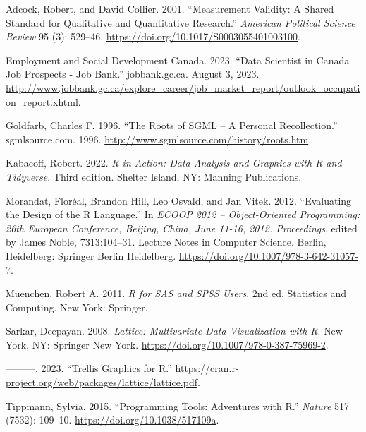 \documentclass[
  letterpaper,
  DIV=11,
  numbers=noendperiod]{scrreprt}
\newlength{\cslhangindent}
\newlength{\cslentryspacingunit} %
\newenvironment{CSLReferences}[2] %
 {%
  \setlength{\parindent}{0pt}
  \ifodd #1
  \let\oldpar\par
  \def\par{\hangindent=\cslhangindent\oldpar}
  \fi
  \setlength{\parskip}{#2\cslentryspacingunit}
 }%
 {}
\begin{document}
\hypertarget{refs}{}
\begin{CSLReferences}{1}{0}
\leavevmode{}%
Adcock, Robert, and David Collier. 2001. {``Measurement {Validity}: {A
Shared Standard} for {Qualitative} and {Quantitative Research}.''}
\emph{American Political Science Review} 95 (3): 529--46.
\url{https://doi.org/10.1017/S0003055401003100}.

\leavevmode{}%
Employment and Social Development Canada. 2023. {``Data {Scientist} in
{Canada} \textbar{} {Job} Prospects - {Job Bank}.''} {jobbank.gc.ca}.
August 3, 2023.
\url{http://www.jobbank.gc.ca/explore_career/job_market_report/outlook_occupation_report.xhtml}.

\leavevmode{}%
Goldfarb, Charles F. 1996. {``The {Roots} of {SGML} -- {A Personal
Recollection}.''} {sgmlsource.com}. 1996.
\url{http://www.sgmlsource.com/history/roots.htm}.

\leavevmode{}%
Kabacoff, Robert. 2022. \emph{R in Action: Data Analysis and Graphics
with {R} and {Tidyverse}}. Third edition. {Shelter Island, NY}: {Manning
Publications}.

\leavevmode{}%
Morandat, Floréal, Brandon Hill, Leo Osvald, and Jan Vitek. 2012.
{``Evaluating the {Design} of the {R Language}.''} In \emph{{ECOOP} 2012
-- {Object-Oriented Programming}: 26th {European Conference}, {Beijing},
{China}, {June} 11-16, 2012. {Proceedings}}, edited by James Noble,
7313:104--31. Lecture {Notes} in {Computer Science}. {Berlin,
Heidelberg}: {Springer Berlin Heidelberg}.
\url{https://doi.org/10.1007/978-3-642-31057-7}.

\leavevmode{}%
Muenchen, Robert A. 2011. \emph{R for {SAS} and {SPSS} Users}. 2nd ed.
Statistics and Computing. {New York}: {Springer}.

\leavevmode{}%
Sarkar, Deepayan. 2008. \emph{Lattice: {Multivariate Data Visualization}
with {R}}. {New York, NY}: {Springer New York}.
\url{https://doi.org/10.1007/978-0-387-75969-2}.

\leavevmode{}%
---------. 2023. {``Trellis {Graphics} for {R}.''}
\url{https://cran.r-project.org/web/packages/lattice/lattice.pdf}.

\leavevmode{}%
Tippmann, Sylvia. 2015. {``Programming Tools: {Adventures} with {R}.''}
\emph{Nature} 517 (7532): 109--10.
\url{https://doi.org/10.1038/517109a}.


\end{CSLReferences}
\end{document}
